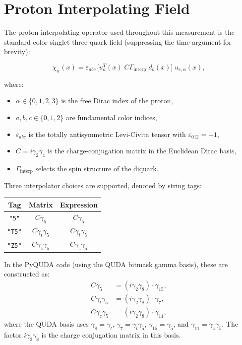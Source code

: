 \documentclass[11pt,a4paper]{article}
\newcommand{\eps}{\varepsilon}
\newcommand{\Gammaint}{\Gamma_{\text{interp}}}
\newcommand{\Cg}{C\gamma_5}
\newcommand{\CgT}{C\gamma_t\gamma_5}
\newcommand{\CgZ}{C\gamma_z\gamma_5}
\newcommand{\Cmat}{C}
\begin{document}
\section{Proton Interpolating Field}

The proton interpolating operator used throughout this measurement is the standard
color-singlet three-quark field (suppressing the time argument for brevity):

\begin{equation}
  \chi_\alpha(x) =
    \eps_{abc}\,
    \bigl[ u_a^T(x) \; \Cmat \Gammaint \; d_b(x) \bigr] \;
    u_{c,\alpha}(x),
  \label{eq:proton_interp}
\end{equation}

where:
\begin{itemize}
  \item $\alpha \in \{0,1,2,3\}$ is the free Dirac index of the proton,
  \item $a,b,c \in \{0,1,2\}$ are fundamental color indices,
  \item $\eps_{abc}$ is the totally antisymmetric Levi-Civita tensor with
    $\eps_{012} = +1$,
  \item $\Cmat = i\gamma_2\gamma_4$ is the charge-conjugation matrix in the Euclidean
    Dirac basis,
  \item $\Gammaint$ selects the spin structure of the diquark.
\end{itemize}

Three interpolator choices are supported, denoted by string tags:

\begin{center}
  \begin{tabular}{c|c|c}
    Tag & Matrix & Expression \\
    \hline
    \texttt{"5"}  & $\Cg$   & $\Cmat \gamma_5$ \\
    \texttt{"T5"} & $\CgT$  & $\Cmat \gamma_t \gamma_5$ \\
    \texttt{"Z5"} & $\CgZ$  & $\Cmat \gamma_z \gamma_5$
  \end{tabular}
\end{center}

In the PyQUDA code (using the QUDA bitmask gamma basis), these are constructed as:
\begin{align}
  \Cg   &= (i\gamma_2 \gamma_8) \cdot \gamma_{15}, \label{eq:Cg5_code} \\
  \CgT  &= (i\gamma_2 \gamma_8) \cdot \gamma_7,  \label{eq:CgT5_code} \\
  \CgZ  &= (i\gamma_2 \gamma_8) \cdot \gamma_{11}, \label{eq:CgZ5_code}
\end{align}
where the QUDA basis uses $\gamma_8 = \gamma_t$, $\gamma_7 = \gamma_t\gamma_5$,
$\gamma_{15} = \gamma_5$, and $\gamma_{11} = \gamma_z\gamma_5$. The factor
$i\gamma_2\gamma_8$ is the charge conjugation matrix in this basis.
\end{document}
